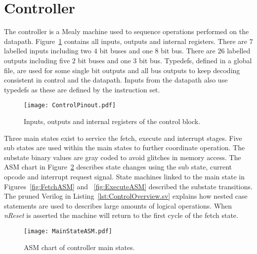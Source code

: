 \section{Controller}
\label{sec:controller}

The controller is a Mealy machine used to sequence operations performed on the datapath.
Figure~\ref{fig:ControlBlock} contains all inputs, outputs and internal registers.
There are $7$ labelled inputs including two $4$ bit buses and one $8$ bit bus.
There are $26$ labelled outputs including five $2$ bit buses and one $3$ bit bus.
Typedefs, defined in a global file, are used for some single bit outputs and all bus outputs to keep decoding consistent in control and the datapath. 
Inputs from the datapath also use typedefs as these are defined by the instruction set. 

\begin{figure}[t]
   \centering
    \texttt{[image: ControlPinout.pdf]}
		\caption{Inputs, outputs and internal registers of the control block.}%
   \label{fig:ControlBlock}
\end{figure}

Three main states exist to service the fetch, execute and interrupt stages.
Five sub states are used within the main states to further coordinate operation.
The substate binary values are gray coded to avoid glitches in memory access.
The ASM chart in Figure~\ref{fig:MainStateASM} describes state changes using the sub state, current opcode and interrupt request signal.   
State machines linked to the main state in Figures~\ref{fig:FetchASM} and ~\ref{fig:ExecuteASM} described the substate transitions.
The pruned Verilog in Listing~\ref{lst:ControlOverview.sv} explains how nested case statements are used to describes large amounts of logical operations. 
When \textit{nReset} is asserted the machine will return to the first cycle of the fetch state.




\begin{figure}[ht]
   \centering
    \texttt{[image: MainStateASM.pdf]}
		\caption{ASM chart of controller main states.}
		\label{fig:MainStateASM}
\end{figure}













